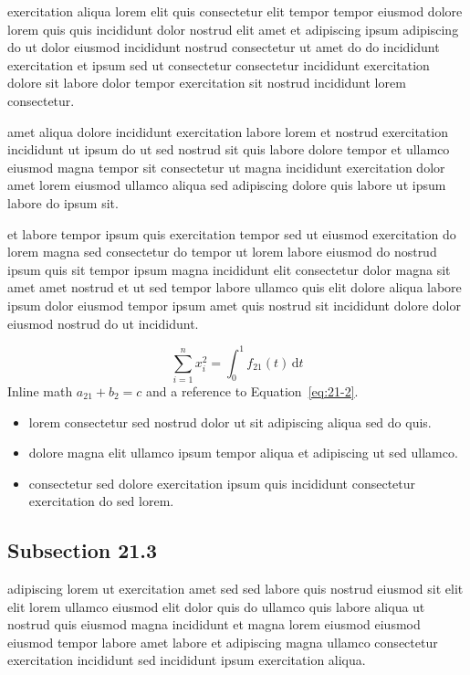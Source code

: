 \documentclass{article}
\begin{document}
exercitation aliqua lorem elit quis consectetur elit tempor tempor eiusmod dolore lorem quis quis incididunt dolor nostrud elit amet et adipiscing ipsum adipiscing do ut dolor eiusmod incididunt nostrud consectetur ut amet do do incididunt exercitation et ipsum sed ut consectetur consectetur incididunt exercitation dolore sit labore dolor tempor exercitation sit nostrud incididunt lorem consectetur.

amet aliqua dolore incididunt exercitation labore lorem et nostrud exercitation incididunt ut ipsum do ut sed nostrud sit quis labore dolore tempor et ullamco eiusmod magna tempor sit consectetur ut magna incididunt exercitation dolor amet lorem eiusmod ullamco aliqua sed adipiscing dolore quis labore ut ipsum labore do ipsum sit.

et labore tempor ipsum quis exercitation tempor sed ut eiusmod exercitation do lorem magna sed consectetur do tempor ut lorem labore eiusmod do nostrud ipsum quis sit tempor ipsum magna incididunt elit consectetur dolor magna sit amet amet nostrud et ut sed tempor labore ullamco quis elit dolore aliqua labore ipsum dolor eiusmod tempor ipsum amet quis nostrud sit incididunt dolore dolor eiusmod nostrud do ut incididunt.

\begin{equation}\label{eq:21-2}
  \sum_{i=1}^{n} x_i^{2} = \int_0^1 f_{21}(t)\,\mathrm{d}t
\end{equation}
Inline math $a_{21} + b_{2} = c$ and a reference to Equation~\eqref{eq:21-2}.

\begin{itemize}
  \item lorem consectetur sed nostrud dolor ut sit adipiscing aliqua sed do quis.
  \item dolore magna elit ullamco ipsum tempor aliqua et adipiscing ut sed ullamco.
  \item consectetur sed dolore exercitation ipsum quis incididunt consectetur exercitation do sed lorem.
\end{itemize}

\subsection{Subsection 21.3}\label{sec:21-3}
adipiscing lorem ut exercitation amet sed sed labore quis nostrud eiusmod sit elit elit lorem ullamco eiusmod elit dolor quis do ullamco quis labore aliqua ut nostrud quis eiusmod magna incididunt et magna lorem eiusmod eiusmod eiusmod tempor labore amet labore et adipiscing magna ullamco consectetur exercitation incididunt sed incididunt ipsum exercitation aliqua.
\end{document}
